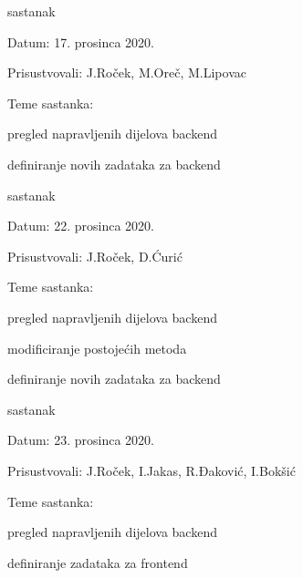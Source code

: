 \begin{packed_enum}
\begin{packed_item}
\begin{packed_item}
			\end{packed_item}
		\end{packed_item}
		
			\item  sastanak
		\item[] \begin{packed_item}
			\item Datum: 17. prosinca 2020.
			\item Prisustvovali: J.Roček, M.Oreč, M.Lipovac 
			\item Teme sastanka:
			\begin{packed_item}
				\item pregled napravljenih dijelova backend
			    \item definiranje novih zadataka za backend
			\end{packed_item}
		\end{packed_item}
		
			\item  sastanak
		\item[] \begin{packed_item}
			\item Datum: 22. prosinca 2020.
			\item Prisustvovali: J.Roček, D.Ćurić 
			\item Teme sastanka:
			\begin{packed_item}
				\item pregled napravljenih dijelova backend
			    \item modificiranje postojećih metoda 
			    \item definiranje novih zadataka za backend
			\end{packed_item}
		\end{packed_item}
		
		    \item  sastanak
		\item[] \begin{packed_item}
			\item Datum: 23. prosinca 2020.
			\item Prisustvovali: J.Roček, I.Jakas, R.Đaković, I.Bokšić
			\item Teme sastanka:
			\begin{packed_item}
				\item pregled napravljenih dijelova backend
			    \item definiranje zadataka za frontend
			\end{packed_item}
		\end{packed_item}
		

\end{packed_enum}
